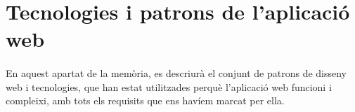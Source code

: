 \section{Tecnologies i patrons de l'aplicació web}

    \paragraph{}
    En aquest apartat de la memòria, es descriurà el conjunt de patrons de disseny web i tecnologies, que han estat utilitzades perquè l'aplicació web funcioni i compleixi, amb tots els requisits que ens havíem marcat per ella.

    
    
    
    
    
    
    
    
    
    
    
